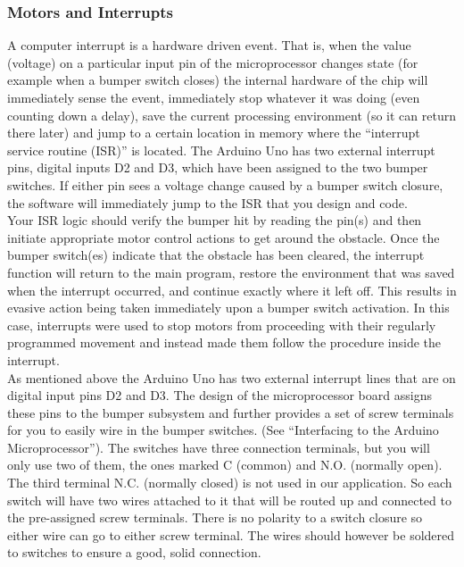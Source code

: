 \documentclass{article}
\begin{document}
    \subsubsection{Motors and Interrupts}
    A computer interrupt is a hardware driven event.  That is, when the value (voltage) on a particular input pin of the microprocessor changes state (for example when a bumper switch closes) the internal hardware of the chip will immediately sense the event, immediately stop whatever it was doing (even counting down a delay), save the current processing environment (so it can return there later) and jump to a certain location in memory where the “interrupt service routine (ISR)” is located. The Arduino Uno has two external interrupt pins, digital inputs D2 and D3, which have been assigned to the two bumper switches.  If either pin sees a voltage change caused by a bumper switch closure, the software will immediately jump to the ISR that you design and code.  \\
    
    Your ISR logic should verify the bumper hit by reading the pin(s) and then initiate appropriate motor control actions to get around the obstacle.  Once the bumper switch(es) indicate that the obstacle has been cleared, the interrupt function will return to the main program, restore the environment that was saved when the interrupt occurred, and continue exactly where it left off.  This results in evasive action being taken immediately upon a bumper switch activation. In this case, interrupts were used to stop motors from proceeding with their regularly programmed movement and instead made them follow the procedure inside the interrupt. \\
    
    As mentioned above the Arduino Uno has two external interrupt lines that are on digital input pins D2 and D3.  The design of the microprocessor board assigns these pins to the bumper subsystem and further provides a set of screw terminals for you to easily wire in the bumper switches. (See “Interfacing to the Arduino Microprocessor”).  The switches have three connection terminals, but you will only use two of them, the ones marked C (common) and N.O. (normally open).  The third terminal N.C. (normally closed) is not used in our application. So each switch will have two wires attached to it that will be routed up and connected to the pre-assigned screw terminals. There is no polarity to a switch closure so either wire can go to either screw terminal. The wires should however be soldered to switches to ensure a good, solid connection.
    
\end{document}
